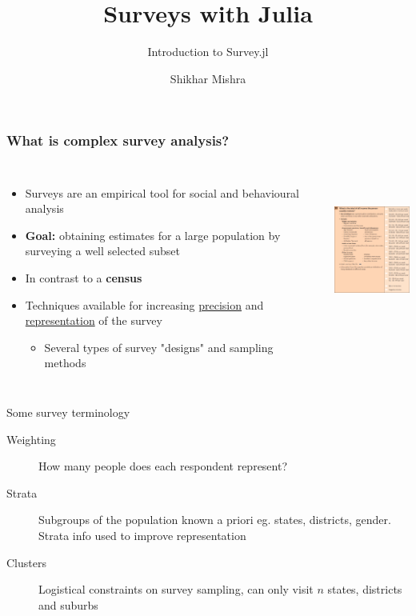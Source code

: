 \documentclass{beamer}          %
\title{Surveys with Julia}
\subtitle{Introduction to Survey.jl}
\author{Shikhar Mishra}
\begin{document}
\begin{frame}
  \titlepage
\end{frame}

\begin{frame}
  \frametitle{What is complex survey analysis?}
  \begin{columns}
           
  \begin{itemize}
  
  \item Surveys are an empirical tool for social and behavioural analysis
  \item \textbf{Goal:} obtaining estimates for a large population by surveying a well selected subset
  \item In contrast to a \textbf{census}
  \item Techniques available for increasing \underline{precision} and \underline{representation} of the survey
   	\begin{itemize}
  		\item Several types of survey "designs" and sampling methods
  	\end{itemize} 
	\end{itemize}
	
	\centering
	\includegraphics[height=5cm, width=3.5cm]{Q38}
\end{columns}
\end{frame}

\begin{frame}{Some survey terminology}
    \begin{description}
    \item[Weighting] How many people does each respondent represent?
    \item[Strata] Subgroups of the population known a priori eg. states, districts, gender. Strata info used to improve representation
    \item[Clusters] Logistical constraints on survey sampling, can only visit $n$ states, districts and suburbs
    \end{description}
\end{frame}
\end{document}

